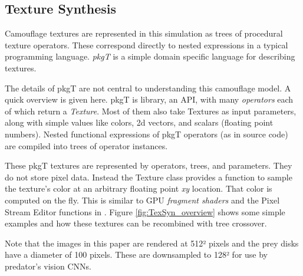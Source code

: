 \documentclass[letterpaper]{article}
\newcommand{\jargon}[1]{\textit{#1}}
\newcommand{\texsyn}[0]{pkgT}
\begin{document}
\subsection{Texture Synthesis}
\label{subsec:texture_synthesis}
Camouflage textures are represented in this simulation as trees of procedural texture operators. These correspond directly to nested expressions in a typical programming language. \jargon{\texsyn{}} is a simple domain specific language for describing textures.
\par
The details of \texsyn{} are not central to understanding this camouflage model. A quick overview is given here. \texsyn{} is library, an API, with many \jargon{operators} each of which return a \jargon{Texture}. Most of them also take Textures as input parameters, along with simple values like colors, 2d vectors, and scalars (floating point numbers). Nested functional expressions of \texsyn{} operators (as in source code) are compiled into trees of operator instances.
\par
These \texsyn{} textures are represented by operators, trees, and parameters. They do not store pixel data. Instead the Texture class provides a function to sample the texture's color at an arbitrary floating point \textit{xy} location. That color is computed on the fly. This is similar to GPU \jargon{fragment shaders} and the Pixel Stream Editor functions in \citet{perlin_image_1985}. Figure \ref{fig:TexSyn_overview} shows some simple examples and how these textures can be recombined with tree crossover.
\par
Note that the images in this paper are rendered at 512² pixels and the prey disks have a diameter of 100 pixels. These are downsampled to 128² for use by predator's vision CNNs.
\par

\end{document}
